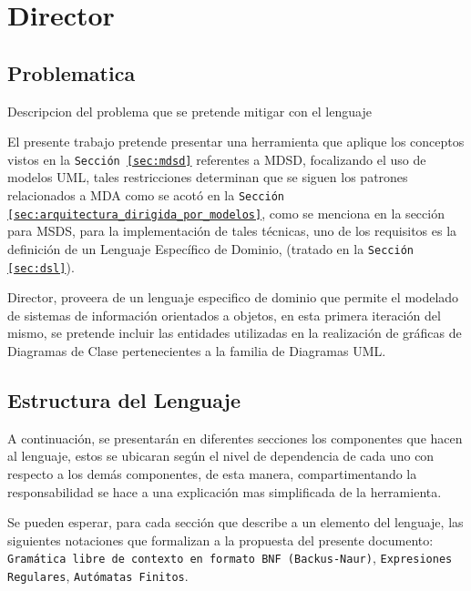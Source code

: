 
\chapter{Director}
\label{sec:director}

\section{Problematica}
\label{sec:problema}
Descripcion del problema que se pretende mitigar con el lenguaje

El presente trabajo pretende presentar una herramienta que aplique los
conceptos vistos en la \texttt{Sección \ref{sec:mdsd}} referentes a MDSD,
focalizando el uso de modelos UML, tales restricciones determinan que se siguen
los patrones relacionados a MDA como se acotó en la
\texttt{Sección \ref{sec:arquitectura_dirigida_por_modelos}}, como se menciona
en la sección para MSDS, para la implementación de tales técnicas, uno de los
requisitos es la definición de un Lenguaje Específico de Dominio, (tratado en
la \texttt{Sección \ref{sec:dsl}}).

Director, proveera de un lenguaje especifico de dominio que permite el modelado de
sistemas de información orientados a objetos, en esta primera iteración del
mismo, se pretende incluir las entidades utilizadas en la realización de
gráficas de Diagramas de Clase pertenecientes a la familia de Diagramas UML.

\section*{Estructura del Lenguaje}
A continuación, se presentarán en diferentes secciones los componentes que
hacen al lenguaje, estos se ubicaran según el nivel de dependencia de cada uno
con respecto a los demás componentes, de esta manera, compartimentando la
responsabilidad se hace a una explicación mas simplificada de la herramienta.

Se pueden esperar, para cada sección que describe a un elemento del lenguaje,
las siguientes notaciones que formalizan a la propuesta del presente
documento: \texttt{Gramática libre de contexto en formato BNF (Backus-Naur)},
\texttt{Expresiones Regulares}, \texttt{Autómatas Finitos}.



















